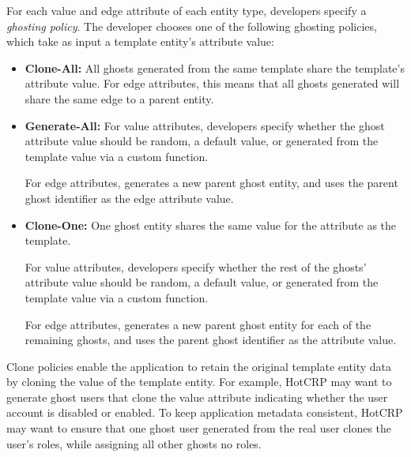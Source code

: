 For each value and edge attribute of each entity type, developers specify a \emph{ghosting policy}.
The developer chooses one of the following ghosting policies, which take as input a template
entity's attribute value:
\begin{itemize}
    \item \textbf{Clone-All:} All ghosts generated from the same template share the template's 
        attribute value. For edge attributes, this means that all ghosts generated will share the
        same edge to a parent entity.

    \item \textbf{Generate-All:} 
        For value attributes, developers specify whether the ghost attribute value should be
        random, a default value, or generated from the template value via a custom function.
        
        For edge attributes, \sys generates a new parent ghost entity, and uses the parent ghost
        identifier as the edge attribute value.

    \item \textbf{Clone-One:} One ghost entity shares the same value for the attribute as the
        template. 
        
        For value attributes, developers specify whether the rest of the ghosts' attribute value should be
        random, a default value, or generated from the template value via a custom function.

        For edge attributes, \sys generates a new parent ghost entity for each of the remaining
        ghosts, and uses the parent ghost identifier as the attribute value.
\end{itemize}
Clone policies enable the application to retain the original template entity data by cloning the value
of the template entity. For example, HotCRP may want to generate ghost users that clone 
the value attribute indicating whether the user account is disabled or enabled. To keep application
metadata consistent, HotCRP may want to ensure that one ghost user generated from the real user
clones the user's roles, while assigning all other ghosts no roles.

%

